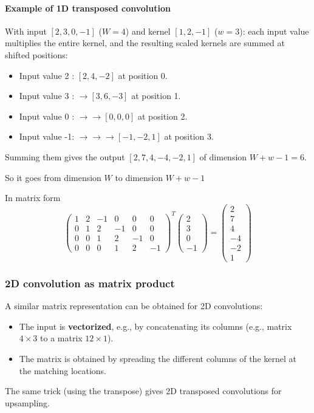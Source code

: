 \paragraph{Example of 1D transposed convolution}
With input $[2, 3, 0, -1]$ ($W = 4$) and kernel $[1, 2, -1]$ ($w = 3$): each input value 
multiplies the entire kernel, and the resulting scaled kernels are summed at shifted positions:
\begin{itemize}
  \item Input value 2 : $[2, 4, -2]$ at position 0.
  \item Input value 3 : $\to [3, 6, -3]$ at position 1.
  \item Input value 0 : $\to \to [0, 0, 0]$ at position 2.
  \item Input value -1: $\to \to \to [-1, -2, 1]$ at position 3.
\end{itemize}
Summing them gives the output $[2, 7, 4, -4, -2, 1]$ of dimension $W + w - 1 = 6$.

So it goes from dimension $W$ to dimension $W + w - 1$

In matrix form \[
  \begin{pmatrix}
    1 & 2 & -1 & 0 & 0 & 0 \\
    0 & 1 & 2 & -1 & 0 & 0 \\
    0 & 0 & 1 & 2 & -1 & 0 \\
    0 & 0  & 0 & 1 & 2 & -1
\end{pmatrix} ^T 
  \begin{pmatrix}
    2 \\
    3 \\
    0 \\
    -1
\end{pmatrix}
= 
\begin{pmatrix}
  2 \\
  7 \\
  4 \\
  -4 \\
  -2 \\
  1
\end{pmatrix}
\]

\subsubsection{2D convolution as matrix product}
A similar matrix representation can be obtained for 2D convolutions:
\begin{itemize}
  \item The input is \textbf{vectorized}, e.g., by concatenating its columns (e.g., matrix $4 \times 3$ to a matrix $12 \times 1$).
  \item The matrix is obtained by spreading the different columns of the kernel at the matching locations.
\end{itemize}
The same trick (using the transpose) gives 2D transposed convolutions for upsampling.

